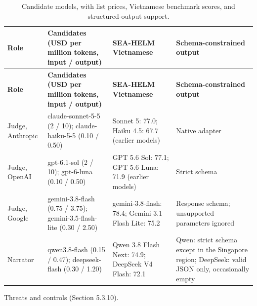 {\small{}\renewcommand{\arraystretch}{1.1}
\begin{longtable}{|>{\raggedright\arraybackslash}p{}|>{\raggedright\arraybackslash}p{}|>{\raggedright\arraybackslash}p{}|>{\raggedright\arraybackslash}p{}|}
\caption{Candidate models, with list prices, Vietnamese benchmark scores, and structured-\allowbreak{}output support.} \\
\hline
\textbf{Role} & \textbf{Candidates (USD per million tokens, input / output)} & \textbf{SEA-HELM Vietnamese} & \textbf{Schema-\allowbreak{}constrained output} \\ \hline
\endfirsthead
\hline
\textbf{Role} & \textbf{Candidates (USD per million tokens, input / output)} & \textbf{SEA-HELM Vietnamese} & \textbf{Schema-\allowbreak{}constrained output} \\ \hline
\endhead
Judge, Anthropic & claude-\allowbreak{}sonnet-\allowbreak{}5-\allowbreak{}5 (2 / 10); claude-\allowbreak{}haiku-\allowbreak{}5-\allowbreak{}5 (0.10 / 0.50) & Sonnet 5: 77.0; Haiku 4.5: 67.7 (earlier models) & Native adapter\cite{r195} \\ \hline
Judge, OpenAI & gpt-6.1-sol (2 / 10); gpt-6-luna (0.10 / 0.50) & GPT 5.6 Sol: 77.1; GPT 5.6 Luna: 71.9 (earlier models) & Strict schema \\ \hline
Judge, Google & gemini-\allowbreak{}3.\allowbreak{}8-\allowbreak{}flash (0.75 / 3.75); gemini-\allowbreak{}3.\allowbreak{}5-\allowbreak{}flash-\allowbreak{}lite (0.30 / 2.50) & gemini-\allowbreak{}3.\allowbreak{}8-\allowbreak{}flash: 78.4; Gemini 3.1 Flash Lite: 75.2 & Response schema; unsupported parameters ignored\cite{r196} \\ \hline
Narrator & qwen3.\allowbreak{}8-\allowbreak{}flash (0.15 / 0.47); deepseek-\allowbreak{}flash (0.30 / 1.20) & Qwen 3.8 Flash Next: 74.9; DeepSeek V4 Flash: 72.1 & Qwen: strict schema except in the Singapore region\cite{r200}; DeepSeek: valid JSON only, occasionally empty\cite{r201} \\ \hline
\end{longtable}
}

Threats and controls (Section 5.3.10).

